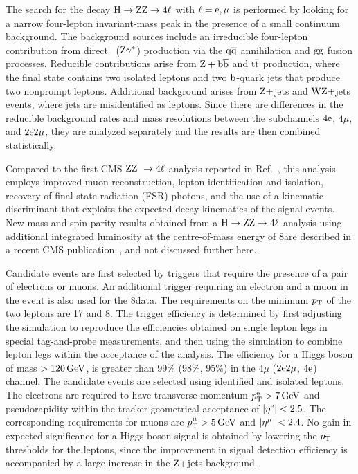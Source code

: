 \documentclass[12pt,twoside,a4paper,cmspaper,final,collab]{cms-tdr}
\begin{document}
The search for the decay $\mathrm{H} \rightarrow  \mathrm{Z}\mathrm{Z}   \rightarrow 4\ell$ with $\ell = \mathrm{e}, \mu$ is performed
by looking for a narrow  four-lepton invariant-mass peak in the presence of a small continuum background.
The background sources include an irreducible four-lepton contribution from direct \cPZ\cPZ\
($\mathrm{Z}\gamma^*$) production via the $\mathrm{q}\mathrm{\overline{q}}$ annihilation and $\mathrm{g}\mathrm{g}$ fusion processes.
Reducible contributions arise from $\mathrm{Z} + \mathrm{b}\overline{\mathrm{b}}$ and $\mathrm{t}\overline{\mathrm{t}}$ production, where the final
state contains two isolated leptons and two $\mathrm{b}$-quark jets that produce two nonprompt leptons.
Additional background arises from $\mathrm{Z}+$jets and $\mathrm{W}\mathrm{Z}+$jets events, where jets are
misidentified as leptons.
Since there are differences in the reducible background rates and mass resolutions between the
subchannels $4\mathrm{e}$, $4\mu$, and $2\mathrm{e}2\mu$, they are analyzed separately and the results are then
combined statistically.

Compared to the first CMS $\mathrm{Z}\mathrm{Z}\ \to 4\ell$ analysis reported in Ref.~\cite{Chatrchyan:2012dg},
this analysis employs improved muon reconstruction, lepton identification
and isolation, recovery of final-state-radiation (FSR) photons, and the use of a kinematic discriminant
that exploits the expected decay kinematics of the signal events.
New mass and spin-parity results obtained from a $\mathrm{H} \rightarrow  \mathrm{Z}\mathrm{Z}   \rightarrow 4\ell$
analysis using additional integrated luminosity at the centre-of-mass energy of 8\TeV are described
in a recent CMS publication~\cite{:2012br}, and not discussed further here.

Candidate events are first selected by triggers that require the presence of a pair of electrons or
muons. An additional trigger requiring an electron and a muon in the event is also used for the 8\TeV data.
The requirements on the minimum $p_{\mathrm{T}}$ of the two leptons are 17 and 8\GeV. %
The trigger efficiency is determined by first adjusting the simulation to reproduce the efficiencies
obtained on single lepton legs in special tag-and-probe measurements, and then using the
simulation to combine lepton legs within the acceptance of the analysis.
The efficiency for a Higgs boson of mass  $> 120\,\text{Ge\hspace{-.08em}V}$, is greater than 99\% (98\%, 95\%) in
the $4\mu$ ($2\mathrm{e} 2\mu$, $4\mathrm{e}$) channel.
The candidate events are selected using identified and isolated leptons.
The electrons are required to have transverse momentum $p_{\mathrm{T}}^{\mathrm{e}} > 7\,\text{Ge\hspace{-.08em}V}$ and pseudorapidity
within the tracker geometrical   acceptance of $|\eta^{\mathrm{e}}| < 2.5$.
The corresponding requirements for muons are $p_{\mathrm{T}}^{{\mu}} > 5\,\text{Ge\hspace{-.08em}V}$ and $|\eta^{{\mu}}| < 2.4$.
No gain in expected significance for a Higgs boson signal
is obtained by lowering the $p_{\mathrm{T}}$ thresholds for the leptons, since the
improvement in signal detection efficiency is accompanied by a large increase in the $\mathrm{Z}+$jets background.
\end{document}
